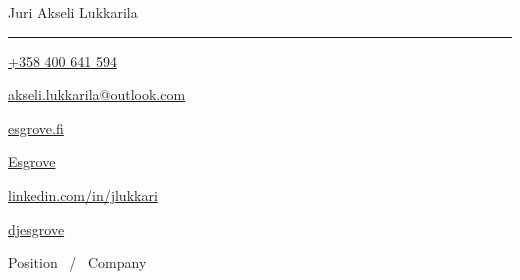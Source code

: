 \documentclass[11pt,a4paper,oneside]{article}
\newcommand*{\logopic}[1]{
        \raisebox{-0.34\baselineskip}{ %
                \texttt{[image: \#1]}}
}
\begin{document}
\begin{minipage}{\textwidth}
        \raggedright
        \centering
        {\Huge \namefont \color{headcolor}{Cover} \color{textcolor}{Letter}} \hfill 
        {\huge \namefont Juri Akseli Lukkarila}
        \vspace{0.8mm}
        \rule[0.8mm]{\textwidth}{2pt}
        \fontsize{9pt}{9pt}\selectfont
        \hspace*{0.5mm}
        \logopic{call.pdf}      \thinspace \href{tel:+358400641594}{+358 400 641 594} \hfill
        \logopic{mail.pdf}      \thinspace \href{mailto:akseli.lukkarila@outlook.com}{akseli.lukkarila@outlook.com} \hfill
        \logopic{web.pdf}       \thinspace \href{http://www.esgrove.fi/}{esgrove.fi} \hfill
        \logopic{github.pdf}    \thinspace \href{https://github.com/Esgrove}{Esgrove} \hfill
        \logopic{linkedin.pdf}  \thinspace \href{https://www.linkedin.com/in/jlukkari/}{linkedin.com/in/jlukkari} \hfill
        \logopic{twitter.pdf}   \thinspace \href{https://twitter.com/djesgrove}{djesgrove}
        \hspace*{0.5mm}
\end{minipage}

\vspace{0.7cm}

\begin{center}
{\titledatefont \LARGE Position \ / \  Company} \\
\end{center}

\Blindtext
\end{document}
